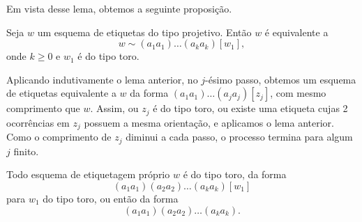 Em vista desse lema, obtemos a seguinte proposição.
\begin{prop} %
    Seja $w$ um esquema de etiquetas do tipo projetivo. Então $w$ é equivalente a
    \[w\sim (a_1 a_1)\ldots (a_k a_k) [w_1],\]
    onde $k \geq 0$ e $w_1$ é do tipo toro.

    \begin{dem}
        Aplicando indutivamente o lema anterior, no $j$-ésimo passo, obtemos um esquema de etiquetas equivalente a $w$ da forma $(a_1 a_1)\ldots (a_j a_j) [z_j]$, com mesmo comprimento que $w$. Assim, ou $z_j$ é do tipo toro, ou existe uma etiqueta cujas 2 ocorrências em $z_j$ possuem a mesma orientação, e aplicamos o lema anterior. Como o comprimento de $z_j$ diminui a cada passo, o processo termina para algum $j$ finito.
    \end{dem}
\end{prop}

\begin{corol} %
    Todo esquema de etiquetagem próprio $w$ é do tipo toro, da forma
    \[(a_1 a_1)(a_2 a_2)\ldots (a_k a_k) [w_1]\]
    para $w_1$ do tipo toro, ou então da forma
    \[(a_1 a_1)(a_2 a_2)\ldots (a_k a_k).\]
\end{corol}

